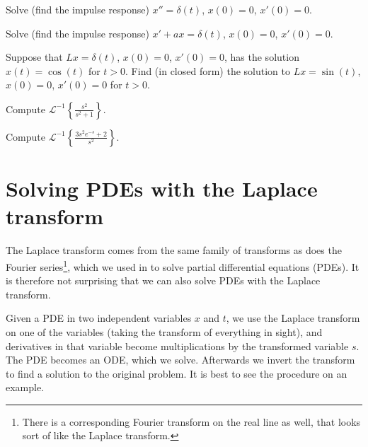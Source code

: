 \begin{exercise}
Solve (find the impulse response)
$x'' = \delta(t)$, $x(0) = 0$, $x'(0)=0$.
\end{exercise}

\begin{exercise}
Solve (find the impulse response)
$x' + a x = \delta(t)$, $x(0) = 0$, $x'(0)=0$.
\end{exercise}

\begin{exercise}
Suppose that $L x = \delta(t)$, $x(0) = 0$, $x'(0) = 0$, has the solution
$x(t) = \cos(t)$ for $t > 0$.  Find (in closed form) the solution to
$Lx = \sin(t)$, $x(0) = 0$, $x'(0) = 0$ for $t > 0$.
\end{exercise}

\begin{exercise}
Compute
${\mathcal{L}}^{-1} \left\{ \frac{s^2}{s^2+1} \right\}$.
\end{exercise}

\begin{exercise}
Compute
${\mathcal{L}}^{-1} \left\{ \frac{3 s^2 e^{-s} + 2}{s^2} \right\}$.
\end{exercise}


\sectionnewpage
\section{Solving PDEs with the Laplace transform}
\label{laplacepde:section}


The Laplace transform comes from the same family of transforms as does the
Fourier series\footnote{There is a corresponding Fourier transform
on the real line as well, that looks sort of like the Laplace transform.},
which we used in  to solve partial differential
equations (PDEs).
It is therefore not surprising that we can also solve PDEs with the Laplace
transform.

Given a PDE in two independent variables $x$ and $t$,  we use the
Laplace transform on one of the variables (taking the transform
of everything in sight), and derivatives in that variable become
multiplications by the transformed variable $s$.
The PDE becomes an ODE, which we solve.
Afterwards we invert the transform to find a solution to the original
problem.
It is best to see the procedure on an example.

